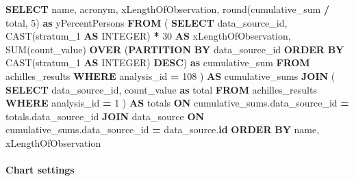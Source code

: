 \documentclass[
]{book}
\newenvironment{Shaded}{\begin{snugshade}}{\end{snugshade}}
\newcommand{\DataTypeTok}[1]{\textcolor[rgb]{0.13,0.29,0.53}{#1}}
\newcommand{\DecValTok}[1]{\textcolor[rgb]{0.00,0.00,0.81}{#1}}
\newcommand{\FunctionTok}[1]{\textcolor[rgb]{0.00,0.00,0.00}{#1}}
\newcommand{\KeywordTok}[1]{\textcolor[rgb]{0.13,0.29,0.53}{\textbf{#1}}}
\newcommand{\NormalTok}[1]{#1}
\newcommand{\OperatorTok}[1]{\textcolor[rgb]{0.81,0.36,0.00}{\textbf{#1}}}
\begin{document}
\begin{Shaded}
\begin{Highlighting}[]
\KeywordTok{SELECT}
\NormalTok{  name,}
\NormalTok{  acronym,}
\NormalTok{  xLengthOfObservation,}
  \FunctionTok{round}\NormalTok{(cumulative\_sum }\OperatorTok{/}\NormalTok{ total, }\DecValTok{5}\NormalTok{) }\KeywordTok{as}\NormalTok{ yPercentPersons}
\KeywordTok{FROM}\NormalTok{ (}
  \KeywordTok{SELECT}\NormalTok{ data\_source\_id, }\FunctionTok{CAST}\NormalTok{(stratum\_1 }\KeywordTok{AS} \DataTypeTok{INTEGER}\NormalTok{) }\OperatorTok{*} \DecValTok{30} \KeywordTok{AS}\NormalTok{ xLengthOfObservation, }\FunctionTok{SUM}\NormalTok{(count\_value) }\KeywordTok{OVER}\NormalTok{ (}\KeywordTok{PARTITION} \KeywordTok{BY}\NormalTok{ data\_source\_id }\KeywordTok{ORDER} \KeywordTok{BY} \FunctionTok{CAST}\NormalTok{(stratum\_1 }\KeywordTok{AS} \DataTypeTok{INTEGER}\NormalTok{) }\KeywordTok{DESC}\NormalTok{) }\KeywordTok{as}\NormalTok{ cumulative\_sum}
  \KeywordTok{FROM}\NormalTok{ achilles\_results}
  \KeywordTok{WHERE}\NormalTok{ analysis\_id }\OperatorTok{=} \DecValTok{108}
\NormalTok{) }\KeywordTok{AS}\NormalTok{ cumulative\_sums}
\KeywordTok{JOIN}\NormalTok{ (}
  \KeywordTok{SELECT}\NormalTok{ data\_source\_id, count\_value }\KeywordTok{as}\NormalTok{ total}
  \KeywordTok{FROM}\NormalTok{ achilles\_results}
  \KeywordTok{WHERE}\NormalTok{ analysis\_id }\OperatorTok{=} \DecValTok{1}
\NormalTok{) }\KeywordTok{AS}\NormalTok{ totals}
\KeywordTok{ON}\NormalTok{ cumulative\_sums.data\_source\_id }\OperatorTok{=}\NormalTok{ totals.data\_source\_id}
\KeywordTok{JOIN}\NormalTok{ data\_source }\KeywordTok{ON}\NormalTok{ cumulative\_sums.data\_source\_id }\OperatorTok{=}\NormalTok{ data\_source.}\KeywordTok{id}
\KeywordTok{ORDER} \KeywordTok{BY}\NormalTok{ name, xLengthOfObservation}
\end{Highlighting}
\end{Shaded}

\hypertarget{chart-settings-5}{%
\paragraph*{Chart settings}\label{chart-settings-5}}
\end{document}
